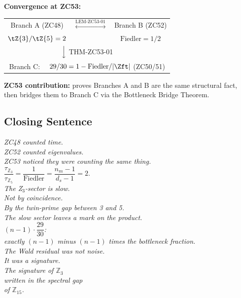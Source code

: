 \documentclass[12pt, a4paper]{article}
\begin{document}
\begin{genealogybox}
\medskip
\textbf{Convergence at ZC53:}

\medskip
\begin{center}
\begin{tabular}{@{}ccc@{}}
Branch A (ZC48) & $\overset{\text{LEM-ZC53-01}}{\longleftrightarrow}$ &
Branch B (ZC52) \\[4pt]
$\tZ{3}/\tZ{5}=2$ & & $\text{Fiedler}=1/2$ \\[6pt]
\multicolumn{3}{c}{$\Big\downarrow$ \small THM-ZC53-01} \\[4pt]
\multicolumn{3}{c}{Branch C: $\quad 29/30 = 1 - \text{Fiedler}/|\Zft|$
  \quad (ZC50/51)} \\
\end{tabular}
\end{center}

\medskip
\textbf{ZC53 contribution:} proves Branches A and B are
the same structural fact, then bridges them to Branch C
via the Bottleneck Bridge Theorem.
\end{genealogybox}

\subsection{Closing Sentence}

\begin{center}
\textit{%
ZC48 counted time.\\
ZC52 counted eigenvalues.\\
ZC53 noticed they were counting the same thing.\\[0.5em]
$\dfrac{\tau_{\mathbb{Z}_3}}{\tau_{\mathbb{Z}_5}}
= \dfrac{1}{\mathrm{Fiedler}} = \dfrac{n_m-1}{d_s-1} = 2.$\\[0.5em]
The Z$_3$-sector is slow.\\
Not by coincidence.\\
By the twin-prime gap between 3 and 5.\\[0.3em]
The slow sector leaves a mark on the product.\\
$(n-1)\cdot\dfrac{29}{30}$:\\
exactly $(n-1)$ minus $(n-1)$ times the bottleneck fraction.\\[0.3em]
The Wald residual was not noise.\\
It was a signature.\\
The signature of $\mathbb{Z}_3$\\
written in the spectral gap\\
of $\mathbb{Z}_{15}$.}
\end{center}
\end{document}
